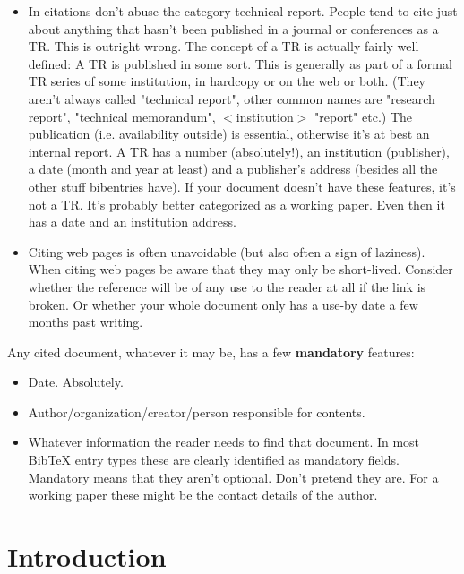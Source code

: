 \documentclass[a4paper,twoside, openright,12pt]{report}
\begin{document}
\begin{itemize}
\item In citations don't abuse the category technical report. People tend to cite just about anything that hasn't been published in a journal or conferences as a TR. This is outright wrong. The concept of a TR is actually fairly well defined: A TR is published in some sort. This is generally as part of a formal TR series of some institution, in hardcopy or on the web or both. (They aren't always called "technical report", other common names are "research report", "technical memorandum", $<$institution$>$ "report" etc.) The publication (i.e. availability outside) is essential, otherwise it's at best an internal report.
A TR has a number (absolutely!), an institution (publisher), a date (month and year at least) and a publisher's address (besides all the other stuff bibentries have).
If your document doesn't have these features, it's not a TR. It's probably better categorized as a working paper. Even then it has a date and an institution address.

\item Citing web pages is often unavoidable (but also often a sign of laziness). When citing web pages be aware that they may only be short-lived. Consider whether the reference will be of any use to the reader at all if the link is broken. Or whether your whole document only has a use-by date a few months past writing.

\end{itemize}

Any cited document, whatever it may be, has a few \textbf{mandatory} features:
\begin{itemize}
	\item Date. Absolutely. 
	\item Author/organization/creator/person responsible for contents.
	\item Whatever information the reader needs to find that document. In most BibTeX entry types these are clearly identified as mandatory fields. Mandatory means that they aren't optional. Don't pretend they are. For a working paper these might be the contact details of the author.
\end{itemize}





\chapter{Introduction}
\end{document}
